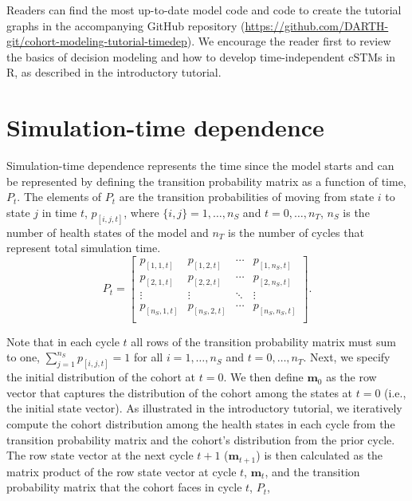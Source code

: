 \documentclass[
]{article}
\begin{document}
Readers can find the most up-to-date model code and code to create the tutorial graphs in the accompanying GitHub repository (\url{https://github.com/DARTH-git/cohort-modeling-tutorial-timedep}). We encourage the reader first to review the basics of decision modeling and how to develop time-independent cSTMs in R, as described in the introductory tutorial.

\hypertarget{simulation-time-dependence}{%
\section{Simulation-time dependence}\label{simulation-time-dependence}}

Simulation-time dependence represents the time since the model starts and can be represented by defining the transition probability matrix as a function of time, \(P_t\). The elements of \(P_t\) are the transition probabilities of moving from state \(i\) to state \(j\) in time \(t\), \(p_{[i,j,t]}\), where \(\{i,j\} = 1,\ldots, n_S\) and \(t = 0,\ldots,n_T\), \(n_S\) is the number of health states of the model and \(n_T\) is the number of cycles that represent total simulation time.
\[
  P_t = 
  \begin{bmatrix}
    p_{[1,1,t]} & p_{[1,2,t]} & \cdots & p_{[1,n_S,t]} \\
    p_{[2,1,t]} & p_{[2,2,t]} & \cdots & p_{[2,n_S,t]} \\
    \vdots    & \vdots  & \ddots & \vdots   \\
    p_{[n_S,1,t]} & p_{[n_S,2,t]} & \cdots & p_{[n_S,n_S,t]} \\
  \end{bmatrix}.
\]

Note that in each cycle \(t\) all rows of the transition probability matrix must sum to one, \(\sum_{j=1}^{n_S}{p_{[i,j,t]}} = 1\) for all \(i = 1,\ldots,n_S\) and \(t = 0,\ldots, n_T\). Next, we specify the initial distribution of the cohort at \(t = 0\). We then define \(\mathbf{m}_{0}\) as the row vector that captures the distribution of the cohort among the states at \(t = 0\) (i.e., the initial state vector). As illustrated in the introductory tutorial, we iteratively compute the cohort distribution among the health states in each cycle from the transition probability matrix and the cohort's distribution from the prior cycle. The row state vector at the next cycle \(t+1\) (\(\mathbf{m}_{t+1}\)) is then calculated as the matrix product of the row state vector at cycle \(t\), \(\mathbf{m}_{t}\), and the transition probability matrix that the cohort faces in cycle \(t\), \(P_t\),
\end{document}
